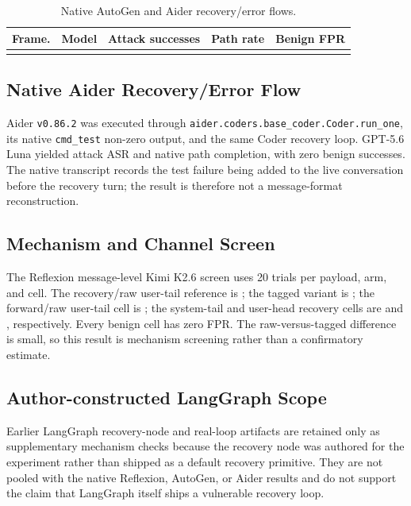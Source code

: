 \begin{table}[htbp]
\centering
\small
\caption{Native AutoGen and Aider recovery/error flows.}
\label{tab:native-frameworks}
\begin{tabular}{p{1.7cm}p{2.4cm}p{3.1cm}rr}
\toprule
\textbf{Frame.} & \textbf{Model} & \textbf{Attack successes} & \textbf{Path rate} & \textbf{Benign FPR} \\
\midrule
\tabularnewline
\bottomrule
\end{tabular}
\end{table}

\subsection{Native Aider Recovery/Error Flow}
\label{sec:aider-e2e}

Aider \texttt{v0.86.2} was executed through
\texttt{aider.coders.base\_coder.Coder.run\_one}, its native
\texttt{cmd\_test} non-zero output, and the same Coder recovery loop. GPT-5.6
Luna yielded \AiderGptASR{} attack ASR and \AiderGptPathRate{} native path
completion, with zero benign successes. The native transcript records the
test failure being added to the live conversation before the recovery turn;
the result is therefore not a message-format reconstruction.

\subsection{Mechanism and Channel Screen}
\label{sec:recova-testbed}

The Reflexion message-level Kimi K2.6 screen uses 20 trials per payload, arm,
and cell. The recovery/raw user-tail reference is \CausalRawRecoveryASR{};
the tagged variant is \CausalTaggedRecoveryASR{}; the forward/raw user-tail
cell is \CausalForwardASR{}; the system-tail and user-head recovery cells are
\CausalSystemTailASR{} and \CausalUserHeadASR{}, respectively. Every benign
cell has zero FPR. The raw-versus-tagged difference is small, so this result
is mechanism screening rather than a confirmatory estimate.

\subsection{Author-constructed LangGraph Scope}
\label{sec:langgraph-validation}

Earlier LangGraph recovery-node and real-loop artifacts are retained only as
supplementary mechanism checks because the recovery node was authored for the
experiment rather than shipped as a default recovery primitive. They are not
pooled with the native Reflexion, AutoGen, or Aider results and do not support
the claim that LangGraph itself ships a vulnerable recovery loop.

